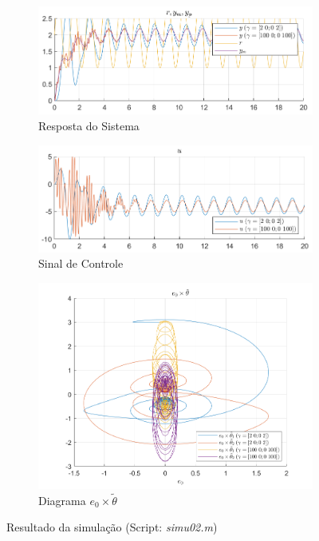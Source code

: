 \documentclass[10pt]{article}
\begin{document}
\begin{figure}[h!]
    \begin{subfigure}[b]{0.45\textwidth}
        \centering
        \includegraphics[width=\textwidth]{img/fig02c.png}
        \caption{Resposta do Sistema}
    \end{subfigure}
    \begin{subfigure}[b]{0.45\textwidth}
        \centering
        \includegraphics[width=\textwidth]{img/fig02e.png}
        \caption{Sinal de Controle}
    \end{subfigure}

    \vspace{0.5cm}

    \begin{subfigure}[b]{0.4\textwidth}
        \centering
        \includegraphics[width=\textwidth]{img/fig02d.png}
        \caption{Diagrama $e_0 \times \tilde{\theta}$}
    \end{subfigure}

    \caption{Resultado da simulação (Script: \textit{simu02.m})}
    \label{fig:sim2}
\end{figure}
\end{document}
